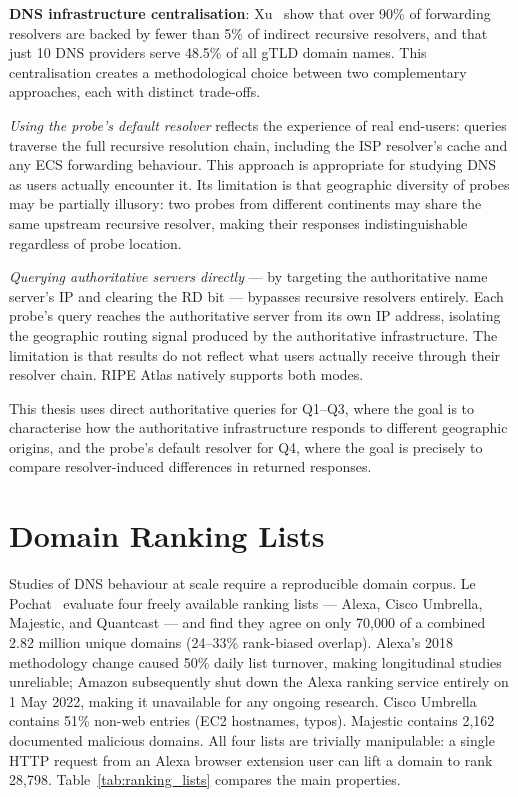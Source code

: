\textbf{\ac{DNS} infrastructure centralisation}: Xu~\cite{Xu2023} show that over 90\% of forwarding resolvers are backed by fewer than 5\% of indirect recursive resolvers, and that just 10 \ac{DNS} providers serve 48.5\% of all g\ac{TLD} domain names. This centralisation creates a methodological choice between two complementary approaches, each with distinct trade-offs.

\textit{Using the probe's default resolver} reflects the experience of real end-users: queries traverse the full recursive resolution chain, including the \ac{ISP} resolver's cache and any \ac{ECS} forwarding behaviour. This approach is appropriate for studying \ac{DNS} as users actually encounter it. Its limitation is that geographic diversity of probes may be partially illusory: two probes from different continents may share the same upstream recursive resolver, making their responses indistinguishable regardless of probe location.

\textit{Querying authoritative servers directly} — by targeting the authoritative name server's \ac{IP} and clearing the \ac{RD} bit — bypasses recursive resolvers entirely. Each probe's query reaches the authoritative server from its own \ac{IP} address, isolating the geographic routing signal produced by the authoritative infrastructure. The limitation is that results do not reflect what users actually receive through their resolver chain. RIPE Atlas natively supports both modes.

This thesis uses direct authoritative queries for Q1–Q3, where the goal is to characterise how the authoritative infrastructure responds to different geographic origins, and the probe's default resolver for Q4, where the goal is precisely to compare resolver-induced differences in returned responses.

\section{Domain Ranking Lists}
\label{sec:2.6}

Studies of \ac{DNS} behaviour at scale require a reproducible domain corpus. Le Pochat~\cite{LePochat2019} evaluate four freely available ranking lists — Alexa, Cisco Umbrella, Majestic, and Quantcast — and find they agree on only 70,000 of a combined 2.82 million unique domains (24–33\% rank-biased overlap). Alexa’s 2018 methodology change caused 50\% daily list turnover, making longitudinal studies unreliable; Amazon subsequently shut down the Alexa ranking service entirely on 1 May 2022, making it unavailable for any ongoing research. Cisco Umbrella contains 51\% non-web entries (EC2 hostnames, typos). Majestic contains 2,162 documented malicious domains. All four lists are trivially manipulable: a single \ac{HTTP} request from an Alexa browser extension user can lift a domain to rank 28,798. Table~\ref{tab:ranking_lists} compares the main properties.

